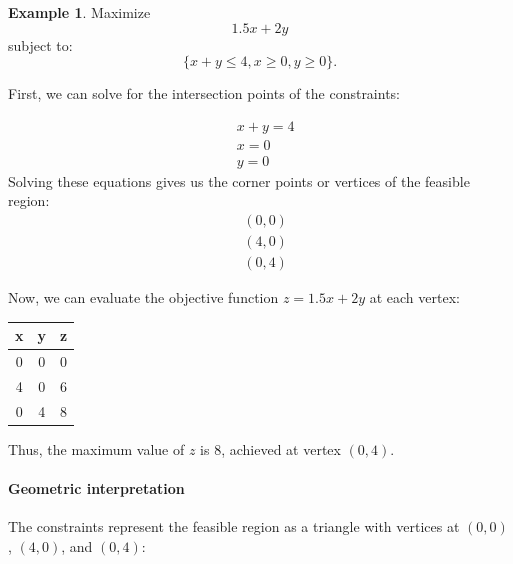 \documentclass[oneside,11pt,dvipsnames]{book}
\numberwithin{equation}{section}
\theoremstyle{definition}
\newtheorem{example}{Example}[section]
\theoremstyle{remark}
\begin{document}
\begin{example}\label{ex:lp-example1}
Maximize
\[
1.5x+2y
\] subject to:
\[
\{x+y \leq 4, x \geq 0, y \geq 0\}.
\]

First, we can solve for the intersection points of the constraints:

\[
\begin{aligned}
& x+y = 4 \\
& x = 0 \\
& y = 0
\end{aligned}
\]
Solving these equations gives us the corner points or vertices of the feasible region:
\[
\begin{aligned}
& (0,0) \\
& (4,0) \\
& (0,4)
\end{aligned}
\]

Now, we can evaluate the objective function $z = 1.5x+2y$ at each vertex:

\begin{center}
\begin{tabular}{ccc}
\hline
x & y & z \\
\hline
0 & 0 & 0 \\
4 & 0 & 6 \\
0 & 4 & 8 \\
\hline
\end{tabular}
\end{center}

Thus, the maximum value of $z$ is 8, achieved at vertex $(0,4)$.


\paragraph{Geometric interpretation} The constraints represent the feasible region as a triangle with vertices at $(0,0)$, $(4,0)$, and $(0,4)$:

\begin{center}
\end{center}
\end{example}
\end{document}

